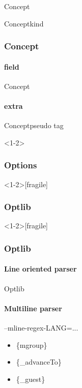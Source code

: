 \documentclass{beamer}
\begin{document}
\begin{frame}{Concept}
\end{frame}
\begin{frame}{Concept}{kind}
\end{frame}
\begin{frame}\frametitle{Concept}
  \framesubtitle{field}
\end{frame}
\begin{frame}{Concept}
  \framesubtitle{extra}
\end{frame}

\begin{frame}[fragile]{Concept}{pseudo tag}
\end{frame}

\begin{frame}<1-2>\frametitle{Options}
\end{frame}

\begin{frame}<1-2>[fragile]\frametitle{Optlib}
\end{frame}

\begin{frame}<1-2>[fragile]\frametitle{Optlib}\framesubtitle{Line oriented parser}
\end{frame}
\begin{frame}[<+->][plain]{Optlib}\framesubtitle{Multiline parser}
--mline-regex-LANG=...
\begin{itemize}
\item \{mgroup\}
\item \{\_advanceTo\}
\item \{\_guest\}
\end{itemize}
\end{frame}
\end{document}
